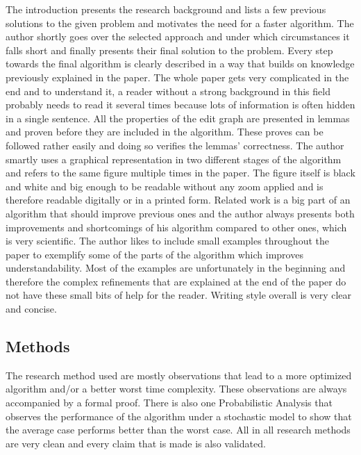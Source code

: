 \documentclass[11pt]{scrartcl}
\begin{document}
The introduction presents the research background and lists a few
previous solutions to the given problem and motivates the need for a
faster algorithm. The author shortly goes over the selected approach and
under which circumstances it falls short and finally presents their
final solution to the problem. Every step towards the final algorithm is
clearly described in a way that builds on knowledge previously explained
in the paper. The whole paper gets very complicated in the end and to
understand it, a reader without a strong background in this field probably
needs to read it several times because lots of information is often
hidden in a single sentence. All the properties of the edit graph are
presented in lemmas and proven before they are included in the
algorithm. These proves can be followed rather easily and doing so
verifies the lemmas' correctness. The author smartly uses a graphical
representation in two different stages of the algorithm and refers to
the same figure multiple times in the paper. The figure itself is black
and white and big enough to be readable without any zoom applied and is
therefore readable digitally or in a printed form. Related work is a big
part of an algorithm that should improve previous ones and the author
always presents both improvements and shortcomings of his algorithm
compared to other ones, which is very scientific. The author likes to
include small examples throughout the paper to exemplify some of the
parts of the algorithm which improves understandability. Most of the
examples are unfortunately in the beginning and therefore the complex
refinements that are explained at the end of the paper do not have these
small bits of help for the reader. 
Writing style overall is very clear
and concise.

\subsection{Methods}
The research method used are mostly observations that lead to a more optimized algorithm and/or a better worst time complexity. These observations are always accompanied by a formal proof.
There is also one Probabilistic Analysis that observes the performance of the algorithm under a stochastic model to show that the average case performs better than the worst case.
All in all research methods are very clean and every claim that is made is also validated.
\end{document}
